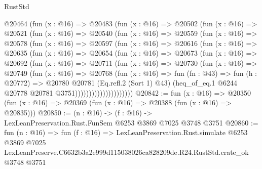 \begin{lexlean}{RustStd}
\begin{coremodule}
        @20464
          (fun (x : @16) =>
          @20483
            (fun (x : @16) =>
            @20502
              (fun (x : @16) =>
              @20521
                (fun (x : @16) =>
                @20540
                  (fun (x : @16) =>
                  @20559
                    (fun (x : @16) =>
                    @20578
                      (fun (x : @16) =>
                      @20597
                        (fun (x : @16) =>
                        @20616
                          (fun (x : @16) =>
                          @20635
                            (fun (x : @16) =>
                            @20654
                              (fun (x : @16) =>
                              @20673
                                (fun (x : @16) =>
                                @20692
                                  (fun (x : @16) =>
                                  @20711
                                    (fun (x : @16) =>
                                    @20730
                                      (fun (x : @16) =>
                                      @20749
                                        (fun (x : @16) =>
                                        @20768
                                          (fun (x : @16) =>
                                          fun (fn : @43) =>
                                          fun (h : @20772) =>
                                          @20780
                                            @20781
                                            (Eq.refl.{2} (Sort 1) @43)
                                            (heq_of_eq.{1}
                                              @6244
                                              @20778
                                              @20781
                                              @3751)))))))))))))))))))))
@20842 := fun (x : @16) =>
  @20350 (fun (x : @16) => @20369 (fun (x : @16) => @20388 (fun (x : @16) => @20835)))
@20850 := (n : @16) -> (f : @16) -> LexLeanPreservation.Rust.FunSem @6253 @3869 @7025 @3748 @3751
@20860 := fun (n : @16) =>
  fun (f : @16) =>
  LexLeanPreservation.Rust.simulate
    @6253
    @3869
    @7025
    LexLeanPreserve.C6632b3a2e999d115038026ca828209de.R24.RustStd.crate_ok
    @3748
    @3751
\end{coremodule}
\end{lexlean}
